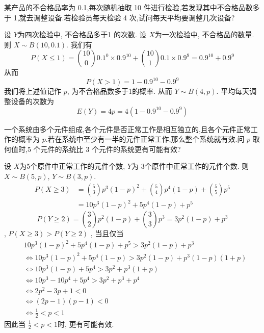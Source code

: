 \documentclass[../main.tex]{subfiles}
\begin{document}
\begin{exercise}{}{}
某产品的不合格品率为 0.1,每次随机抽取 10 件进行检验,若发现其中不合格品数多于 1,就去调整设备.若检验员每天检验 4 次,试问每天平均要调整几次设备?
\end{exercise}
\begin{solution}
          设 \(  Y  \)为四次检验中, 不合格品多于1 的次数. 设 \(  X  \)为一次检验中, 不合格品的数量. 则  \(  X\sim B\left( 10, 0.1 \right)   \). 我们有 \[
    P\left( X\le 1 \right)= \binom{ 10 }{0  }0.1^{0}\times 0.9^{10}+ \binom{ 10 }{1  }0.1\times 0.9^{9}=  0.9^{10}+ 0.9^{9}  
    \]   从而 \[
    P\left( X> 1 \right)= 1-0.9^{10}-0.9^{9} 
    \]我们将上述值记作 \(  p  \), 为不合格品数多于1的概率. 从而 \(  Y\sim B\left( 4,p \right)   \). 平均每天调整设备的次数为 \[
    E\left( Y \right)=  4p= 4\left( 1-0.9^{10}-0.9^{9} \right) 
    \]  
\end{solution}

\begin{exercise}{}{}
一个系统由多个元件组成,各个元件是否正常工作是相互独立的,且各个元件正常工作的概率为 $p$.若在系统中至少有一半的元件正常工作,那么整个系统就有效.问 $p$ 取何值时,5 个元件的系统比 3 个元件的系统更有可能有效?
\end{exercise}
\begin{solution}
      设 \(  X  \)为5个原件中正常工作的元件个数, \(  Y  \)为 \(  3  \)个原件中正常工作的元件个数. 则 \(  X\sim B\left( 5,p \right)   \), \(  Y\sim B\left( 3,p \right)   \). \[
   \begin{aligned}
    P\left( X\ge 3 \right)&= \binom{ 5 }{3  }p^{3}\left( 1-p \right)^{2}+ \binom{ 5 }{4  }p^{4}\left( 1-p \right)+ \binom{ 5 }{5  }p^{5} \\ 
     &= 10p^{3}\left( 1-p \right)^{2}+ 5p^{4}\left( 1-p \right)+ p^{5}  
   \end{aligned}      
    \]     \[
    P\left( Y\ge 2 \right)= \binom{ 3 }{2  }p^{2}\left( 1-p \right) + \binom{ 3 }{3  }p^{3}=    3p^{2}\left( 1-p \right)+ p^{3} 
    \], \(  P\left( X\ge 3 \right)   >  P\left( Y\ge 2 \right) \) , 当且仅当 \[
   \begin{aligned}
    &10p^{3}\left( 1-p \right)^{2}+ 5p^{4}\left( 1-p \right)+ p^{5}> 3p^{2}\left( 1-p \right)+ p^{3}   \\ 
     &\iff 10p^{3}\left( 1-p \right)^{2}+ 5p^{4}\left( 1-p \right)>  3p^{2}\left( 1-p \right)+ p^{3}\left( 1-p \right)\left( 1+ p \right)    \\ 
      &\iff 10p^{3}\left( 1-p \right)+ 5p^{4}>  3p^{2}+ p^{3}\left( 1+ p \right)\\ 
       &\iff 10p^{3}-10p^{4}+ 5p^{4}>  3p^{2}+ p^{3}+ p^{4}\\ 
          &\iff 2p^{2}-3p+ 1<  0\\ 
           &\iff \left( 2p-1 \right)\left( p-1 \right) <  0\\ 
            &\iff \frac{1 }{2 }< p< 1 
   \end{aligned}
    \] 因此当 \(  \frac{1}{2}< p< 1  \)时, 更有可能有效. 
\end{solution}
\end{document}
